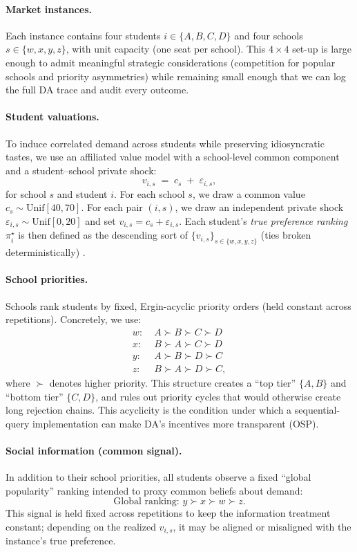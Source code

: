 \documentclass[format=acmsmall, review=false]{acmart}
\begin{document}
\paragraph{Market instances.}
Each instance contains four students $i\in\{A,B,C,D\}$ and four schools $s\in\{w,x,y,z\}$, with unit capacity (one seat per school). This $4\times 4$ set-up is large enough to admit meaningful strategic considerations (competition for popular schools and priority asymmetries) while remaining small enough that we can log the full DA trace and audit every outcome.

\paragraph{Student valuations.}
To induce correlated demand across students while preserving idiosyncratic tastes, we use an affiliated value model with a school-level common component and a student--school private shock:
\[
v_{i,s} \;=\; c_s \;+\; \varepsilon_{i,s},
\]
%
for school $s$ and student $i$.
%
For each school $s$, we draw a common value $c_s \sim \mathrm{Unif}[40,70]$. For each pair $(i,s)$, we draw an independent private shock $\varepsilon_{i,s}\sim \mathrm{Unif}[0,20]$ and set $v_{i,s}=c_s+\varepsilon_{i,s}$. Each student's \emph{true preference ranking} $\pi_i^{\star}$ is then defined as the descending sort of $\{v_{i,s}\}_{s\in\{w,x,y,z\}}$ (ties broken deterministically) \citep{klijn2019static}.

\paragraph{School priorities.}
Schools rank students by fixed, Ergin-acyclic priority orders (held constant across repetitions). Concretely, we use:
\begin{align*}
w:&\; A \succ B \succ C \succ D \\
x:&\; B \succ A \succ C \succ D \\
y:&\; A \succ B \succ D \succ C \\
z:&\; B \succ A \succ D \succ C,
\end{align*}
where $\succ$ denotes higher priority. This structure creates a ``top tier'' $\{A,B\}$ and ``bottom tier'' $\{C,D\}$, and rules out priority cycles that would otherwise create long rejection chains. 
This acyclicity is the condition under which a sequential-query implementation can make DA's incentives more transparent (OSP).

\paragraph{Social information (common signal).}
In addition to their school priorities, all students observe a fixed ``global popularity'' ranking intended to proxy common beliefs about demand:
\[
\text{Global ranking: } y \succ x \succ w \succ z.
\]
This signal is held fixed across repetitions to keep the information treatment constant; depending on the realized $v_{i,s}$, it may be aligned or misaligned with the instance's true preference. 
\end{document}
